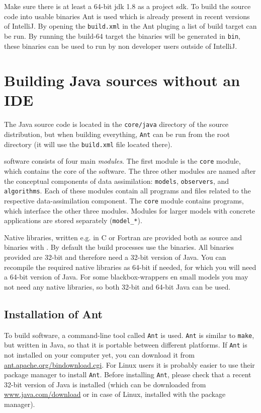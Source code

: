 Make sure there is at least a 64-bit jdk 1.8 as a project sdk.
To build the source code into usable binaries Ant is used which is already present in recent versions of IntelliJ.
By opening the \verb|build.xml| in the Ant pluging a list of build target can be run.
By running the build-64 target the \oda binaries will be generated in \verb|bin|, these binaries can be used to run \oda by non developer users outside of IntelliJ.


\section{Building Java sources without an IDE}
The \oda Java source code is located in the \verb|core/java| directory of the source distribution, but when building everything, \verb|Ant| can be run from the \oda root directory (it will use the \verb|build.xml| file located there).

\oda software consists of four main \emph{modules}. The first module is the \verb|core| module, which contains the core of the \oda software. The three other modules are named after the conceptual components of data assimilation: \verb|models|, \verb|observers|, and \verb|algorithms|. Each of these modules contain all programs and files related to the respective data-assimilation component. The \verb|core| module contains programs, which interface the other three modules. Modules for larger models with concrete applications are stored separately (\verb|model_*|).

Native libraries, written e.g. in C or Fortran are provided both as source and binaries with \oda. By default the build processes use the binaries. All binaries provided are 32-bit and therefore need a 32-bit version of Java. You can recompile the required native libraries as 64-bit if needed, for which you will need a 64-bit version of Java. For some blackbox-wrappers en small models you may not need any native libraries, so both 32-bit and 64-bit Java can be used.

\subsection{Installation of Ant}
To build \oda software, a command-line tool called \verb|Ant| is used. \verb|Ant| is similar to \verb|make|, but written in Java, so that it is portable between different platforms. If \verb|Ant| is not installed on your computer yet, you can download it from \href{http://ant.apache.org/bindownload.cgi}{ant.apache.org/bindownload.cgi}. For Linux users it is probably easier to use their package manager to install \verb|Ant|. Before installing \verb|Ant|, please check that a recent 32-bit version of Java is installed (which can be downloaded from \href{http://www.java.com/download}{www.java.com/download} or in case of Linux, installed with the package manager).

